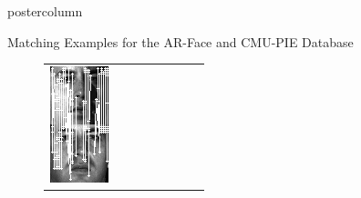 \documentclass[final,hyperref={pdfpagelabels=false}]{beamer}
\begin{document}
\begin{frame}
\begin{columns}
\begin{column}{.49\textwidth}
\begin{beamercolorbox}[center,wd=\textwidth]{postercolumn}
\begin{minipage}[T]{.95\textwidth}
{\begin{block}{Matching Examples for the AR-Face and CMU-PIE Database}
\begin{figure}
\begin{tabular}{p{.09\linewidth} | p{.12\linewidth} | p{.12\linewidth} | p{.12\linewidth} || p{.12\linewidth} | p{.12\linewidth} | p{.12\linewidth} | p{.09\linewidth} }
                  \includegraphics[width=1.0\linewidth]{paper/bmvc09-surf/figures/matchings/cmupie-surf/grid_07-27-22.pgm--07-27-08}
                  &

\end{tabular}
\end{figure}
\end{block}}
\end{minipage}
\end{beamercolorbox}
\end{column}
\end{columns}
\end{frame}
\end{document}
